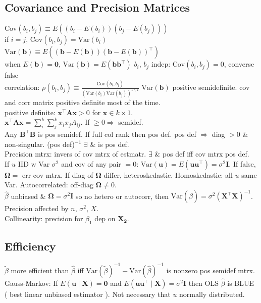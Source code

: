 \subsection*{Covariance and Precision Matrices}
$\text{Cov}(b_i, b_j) \equiv E((b_i - E(b_i))(b_j-E(b_j)))$\\
if $i=j$, $\text{Cov}(b_i, b_j) = \text{Var}(b_i)$\\
$\text{Var}(\mathbf{b}) \equiv E((\mathbf{b}-E(\mathbf{b}))(\mathbf{b}-E(\mathbf{b}))^{\top})$\\
when $E(\mathbf{b}) = \mathbf{0}$, $\text{Var}(\mathbf{b}) = E(\mathbf{bb^{\top}})$
$b_i$, $b_j$ indep: $\text{Cov}(b_i, b_j) = 0$, converse false\\
correlation: $\rho(b_i, b_j) \equiv \frac{\text{Cov}(b_i, b_j)}{(\text{Var}(b_i)\text{Var}(b_j))^{1 \backslash 2}}$
$\text{Var}(\mathbf{b})$ positive semidefinite.
cov and corr matrix positive definite most of the time.\\
positive definite: $\mathbf{x^{\top}Ax} > 0$ for $\mathbf{x} \in k \times 1$.\\
$\mathbf{x^{\top}Ax} = \sum_{i}^{k}\sum_{j}^{k} x_i x_j A_{ij}$.
If $ \geq 0 \Rightarrow$ semidef.\\
Any $\mathbf{B^{\top}B}$ is pos semidef.
If full col rank then pos def.
pos def $\Rightarrow$ diag $> 0$ \& non-singular.
(pos def)$^{-1}$ $\exists$ \& is pos def.\\
Precision mtrx: invers of cov mtrx of estmatr.
$\exists$ \& pos def iff cov mtrx pos def.\\
If $u$ IID w Var $\sigma^2$ and cov of any pair $=0$: $\text{Var}(\mathbf{u})=E(\mathbf{uu^{\top}}) = \sigma^{2}\mathbf{I}$.
If false, $\mathbf{\Omega} = $ err cov mtrx.
If diag of $\mathbf{\Omega}$ differ, heteroskedastic.
Homoskedastic: all $u$ same Var.
Autocorrelated: off-diag $\mathbf{\Omega} \neq 0$.\\
$\hat{\beta}$ unbiased \& $\mathbf{\Omega}=\sigma^{2}\mathbf{I}$ so no hetero or autocorr, then $\text{Var}(\hat{\beta})=\sigma^2(\mathbf{X^{\top}X})^{-1}$.\\
Precision affected by $n$, $\sigma^2$, $X$.\\
Collinearity: precision for $\beta_1$ dep on $\mathbf{X_2}$.
\subsection*{Efficiency}
$\tilde{\beta}$ more efficient than $\hat{\beta}$ iff $\text{Var}(\tilde{\beta})^{-1} - \text{Var}(\hat{\beta})^{-1}$ is nonzero pos semidef mtrx.\\
Gauss-Markov: If $E(\mathbf{u} \mid \mathbf{X}) = \mathbf{0}$ and $E(\mathbf{uu^{\top}} \mid \mathbf{X}) = \sigma^{2}\mathbf{I}$ then OLS $\hat{\beta}$ is BLUE ( best linear unbiased estimator ).
Not necessary that $u$ normally distributed.
